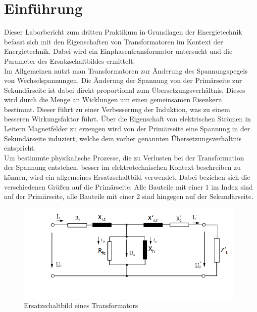 \documentclass{article}
\begin{document}
\newpage


\tableofcontents

\listoffigures

\listoftables


\newpage

\section{Einführung}

Dieser Laborbericht zum dritten Praktikum in Grundlagen der Energietechnik befasst sich  mit den Eigenschaften von Transformatoren im Kontext der Energietechnik. Dabei wird ein Einphasentransformator untersucht und die Parameter des Ersatzschaltbildes ermittelt.\\


\noindent
Im Allgemeinen nutzt man Transformatoren zur Änderung des Spannungspegels von Wechselspannungen. Die Änderung der Spannung von der Primärseite zur Sekundärseite ist dabei direkt proportional zum Übersetzungsverhältnis. Dieses wird durch die Menge an Wicklungen um einen gemeinsamen Eisenkern bestimmt. Dieser führt zu einer Verbesserung der Induktion, was zu einem besseren Wirkungsfaktor führt. Über die Eigenschaft von elektrischen Strömen in Leitern Magnetfelder zu erzeugen wird von der Primärseite eine Spannung in der Sekundärseite induziert, welche dem vorher genannten Übersetzungsverhältnis entspricht.\\

\noindent
Um bestimmte physikalische Prozesse, die zu Verlusten bei der Transformation der Spannung entstehen, besser im elektrotechnischen Kontext beschreiben zu können, wird ein allgemeines Ersatzschaltbild verwendet. Dabei beziehen sich die verschiedenen Größen auf die Primärseite. Alle Bauteile mit einer $1$ im Index sind auf der Primärseite, alle Bauteile mit einer $2$ sind hingegen auf der Sekundärseite.

\begin{figure}[h]
  \centering
  \includegraphics[width=\textwidth]{../assets/images/gep3/esb.png}
  \caption{Ersatzschaltbild eines Transformators}
  \label{fig:esbtrafo}
\end{figure}
\end{document}
